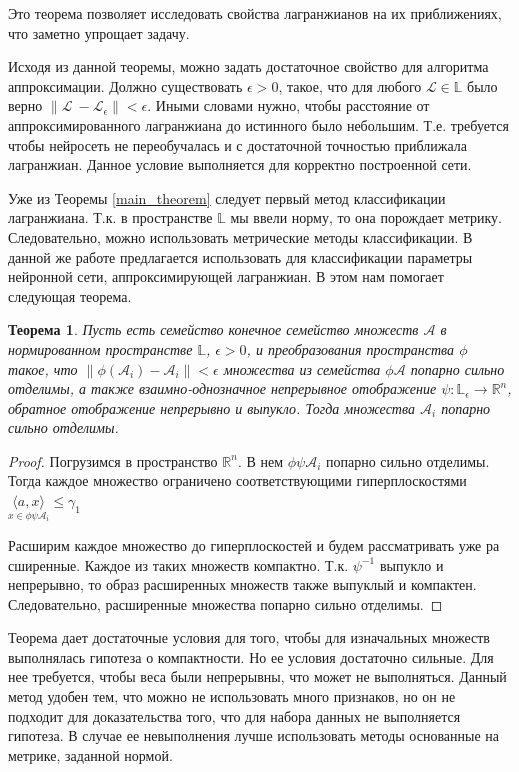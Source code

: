 \documentclass[12pt, twoside]{article}
\newtheorem{theorem}{Теорема}
\begin{document}
Это теорема позволяет исследовать свойства лагранжианов на их приближениях, что заметно упрощает задачу.

Исходя из данной теоремы, можно задать достаточное свойство для алгоритма аппроксимации. Должно существовать $\epsilon > 0$, такое, что для любого $\mathcal{L} \in \mathbb{L}$ было верно $\|\mathcal{L}\ - \mathcal{L}_{\epsilon}\| < \epsilon$. Иными словами нужно, чтобы расстояние от аппроксимированного лагранжиана до истинного было небольшим. Т.е. требуется чтобы нейросеть не переобучалась и с достаточной точностью приближала лагранжиан. Данное условие выполняется для корректно построенной сети.

Уже из Теоремы \ref{main_theorem} следует первый метод классификации лагранжиана. Т.к. в пространстве $\mathbb{L}$
мы ввели норму, то она порождает метрику. Следовательно, можно использовать метрические методы классификации. В данной же работе предлагается использовать для классификации параметры нейронной сети, аппроксимирующей лагранжиан. В этом нам помогает следующая теорема.

\begin{theorem} \label{r_theorem}
Пусть есть семейство конечное семейство множеств $\mathcal{A}$ в нормированном пространстве $\mathbb{L}$, $\epsilon > 0$, и преобразования пространства $\phi$ такое, что $\|\phi(\mathcal{A}_{i}) - \mathcal{A}_{i}\| < \epsilon$ множества из семейства $\phi{\mathcal{A}}$ попарно сильно отделимы, а также взаимно-однозначное непрерывное отображение $\psi: \mathbb{L}_{\epsilon} \rightarrow \mathbb{R}^{n}$, обратное отображение непрерывно и выпукло. Тогда множества $\mathcal{A}_{i}$ попарно сильно отделимы.
\end{theorem}

\begin{proof}
Погрузимся в пространство $\mathbb{R}^{n}$. В нем $\phi\psi \mathcal{A}_{i}$ попарно сильно отделимы. Тогда каждое множество ограничено соответствующими гиперплоскостями $\underset{x \in \phi\psi\mathcal{A}_{i}}{\langle a, x \rangle}\leq \gamma_{1}$

Расширим каждое множество до гиперплоскостей и будем рассматривать уже ра
сширенные. Каждое из таких множеств компактно. Т.к. $\psi^{-1}$ выпукло и непрерывно, то образ расширенных множеств также выпуклый и компактен. Следовательно, расширенные множества попарно сильно отделимы.
\end{proof}

Теорема дает достаточные условия для того, чтобы для изначальных множеств выполнялась гипотеза о компактности. Но ее условия достаточно сильные. Для нее требуется, чтобы веса были непрерывны, что может не выполняться.  Данный метод удобен тем, что можно не использовать много признаков, но он не подходит для доказательства того, что для набора данных не выполняется гипотеза. В случае ее невыполнения лучше использовать методы основанные на метрике, заданной нормой. 
\end{document}
